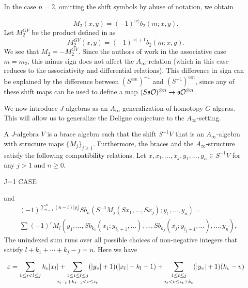 \documentclass[Thesis.tex]{subfiles}
\begin{document}
\begin{remark}
In the case $n=2$, omitting the shift symbols by abuse of notation, we obtain 

\[M_2(x,y)=(-1)^{|x|}b_2(m;x,y).\]
Let $M^{GV}_2$ be the product defined in \cite{GV} as \[M^{GV}_2(x,y)=(-1)^{|x|+1}b_2(m;x,y).\] We see that $M_2=-M^{GV}_2$. Since the authors of \cite{GV} work in the associative case $m=m_2$, this minus sign does not affect the $A_\infty$-relation (which in this case reduces to the associativity and differential relations). This difference in sign can be explained by the difference between $(S^{\otimes n})^{-1}$ and $(S^{-1})^{\otimes n}$, since any of these shift maps can be used to define a map $(S\mathfrak{s}{\mathcal O})^{\otimes n}\to \mathfrak{s}{\mathcal O}^{\otimes n}$. 
\end{remark}

We now introduce $J$-algebras as an $A_\infty$-generalization of homotopy $G$-algeras. This will allow us to generalize the Deligne conjecture to the $A_\infty$-setting.

\begin{defin}
A $J$-algebra $V$ is a brace algebra such that the shift $S^{-1}V$ that is an $A_\infty$-algebra with structure maps $\{M_j\}_{j\geq 1}$. Furthermore, the braces and the $A_\infty$-structure satisfy the following compatibility relations. Let $x, x_1,\dots, x_j, y_1,\dots, y_n\in S^{-1}V$ for any $j>1$ and $n\geq 0$.  

J=1 CASE

and 
\begin{align*}
&(-1)^{\sum_{i=1}^n(n-i)|y_i|}Sb_n(S^{-1}M_j(Sx_1,\dots, Sx_j);y_1,\dots, y_n)=\\
&\sum_{}(-1)^{\varepsilon}M_l(y_1,\dots, Sb_{k_1}(x_1;y_{i_1+1},\dots),\dots, Sb_{k_j}(x_j;y_{i_j+1},\dots),\dots, y_n),
\end{align*}
The unindexed sum runs over all possible choices of non-negative integers that satisfy $l+k_1+\cdots+k_j-j=n$. Here we have

\[
\varepsilon = \sum_{1\leq i< l\leq j}k_v|x_l|+\underset{\mathclap{i_{t-1}+k_{t-1}< v\leq i_t}}{\sum_{1\leq t\leq l\leq j}}(|y_v|+1)(|x_l|-k_l+1)+\underset{i_t<v\leq i_t+k_t}{\sum_{1\leq t\leq j}} (|y_v|+1)(k_v-v)
\]

\end{defin}
\end{document}
